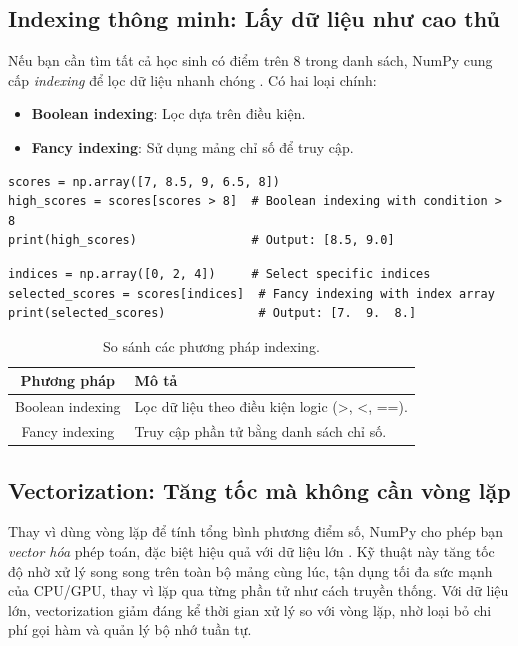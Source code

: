\subsection{Indexing thông minh: Lấy dữ liệu như cao thủ}
Nếu bạn cần tìm tất cả học sinh có điểm trên 8 trong danh sách, NumPy cung cấp \textit{indexing} để lọc dữ liệu nhanh chóng \cite{numpy_indexing}. Có hai loại chính:
\begin{itemize}
  \item \textbf{Boolean indexing}: Lọc dựa trên điều kiện.
  \item \textbf{Fancy indexing}: Sử dụng mảng chỉ số để truy cập.
\end{itemize}

\begin{lstlisting}[caption={Boolean indexing lọc điểm cao}]
scores = np.array([7, 8.5, 9, 6.5, 8])
high_scores = scores[scores > 8]  # Boolean indexing with condition > 8
print(high_scores)                # Output: [8.5, 9.0]
\end{lstlisting}

\begin{lstlisting}[caption={Fancy indexing truy cập chỉ số}]
indices = np.array([0, 2, 4])     # Select specific indices
selected_scores = scores[indices]  # Fancy indexing with index array
print(selected_scores)             # Output: [7.  9.  8.]
\end{lstlisting}

\begin{table}[H]
\centering
\begin{tabularx}{0.8\textwidth}{|c|X|}
\hline
\textbf{Phương pháp} & \textbf{Mô tả} \\
\hline
Boolean indexing & Lọc dữ liệu theo điều kiện logic (>, <, ==). \\
Fancy indexing & Truy cập phần tử bằng danh sách chỉ số. \\
\hline
\end{tabularx}
\caption{So sánh các phương pháp indexing.}
\label{tab:indexing}
\end{table}

\subsection{Vectorization: Tăng tốc mà không cần vòng lặp}
Thay vì dùng vòng lặp để tính tổng bình phương điểm số, NumPy cho phép bạn \textit{vector hóa} phép toán, đặc biệt hiệu quả với dữ liệu lớn \cite{solomon_noloops}. Kỹ thuật này tăng tốc độ nhờ xử lý song song trên toàn bộ mảng cùng lúc, tận dụng tối đa sức mạnh của CPU/GPU, thay vì lặp qua từng phần tử như cách truyền thống. Với dữ liệu lớn, vectorization giảm đáng kể thời gian xử lý so với vòng lặp, nhờ loại bỏ chi phí gọi hàm và quản lý bộ nhớ tuần tự.

